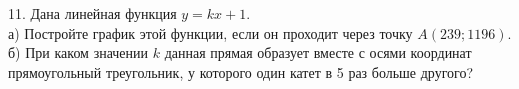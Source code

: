 11. Дана линейная функция $y=kx+1.$\\
а) Постройте график этой функции, если он проходит через точку $A(239;1196).$\\
б) При каком значении $k$ данная прямая образует вместе с осями координат прямоугольный треугольник, у которого один катет в 5 раз больше другого?\\
